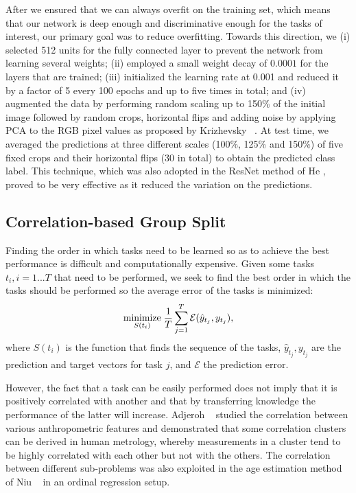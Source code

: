 \documentclass[10pt,twocolumn,letterpaper]{article}
\begin{document}
	After we ensured that we can always overfit on the training set, which means that our network is deep enough and discriminative enough for the tasks of interest, our primary goal was to reduce overfitting. Towards this direction, we (i) selected 512 units for the fully connected layer to prevent the network from learning several weights; (ii) employed a small weight decay of \(0.0001\) for the layers that are trained; (iii) initialized the learning rate at 0.001 and reduced it by a factor of 5 every 100 epochs and up to five times in total; and (iv) augmented the data by performing random scaling up to 150\% of the initial image followed by random crops, horizontal flips and adding noise by applying PCA to the RGB pixel values as proposed by Krizhevsky \etal~\cite{krizhevsky2012imagenet}. At test time, we averaged the predictions at three different scales (100\%, 125\% and 150\%) of five fixed crops and their horizontal flips (30 in total) to obtain the predicted class label. This technique, which was also adopted in the ResNet method of He \etal \cite{resNets2016}, proved to be very effective as it reduced the variation on the predictions.
	
	
	\subsection{Correlation-based Group Split}
	Finding the order in which tasks need to be learned so as to achieve the best performance is difficult and computationally expensive. Given some tasks \(t_i, i=1...T\) that need to be performed, we seek to find the best order in which the tasks should be performed so the average error of the tasks is minimized: 
	\begin{equation}\label{eq:1}
	\displaystyle \underset{\substack{S(t_i)}}{\text{minimize}} \; {\frac{1}{T}\sum\limits_{j=1}^{T} \mathcal{E}(\hat{y}_{t_j},y_{t_j}),}\\
	\end{equation}
	where \(S(t_i)\) is the function that finds the sequence of the tasks, \(\hat{y}_{t_j},y_{t_j}\) are the prediction and target vectors for task \(j\), and \(\mathcal{E}\) the prediction error. 
	
	However, the fact that a task can be easily performed does not imply that it is  positively correlated with another and that by transferring knowledge the performance of the latter will increase. Adjeroh \etal~\cite{D_2010_11241} studied the correlation between various anthropometric features and demonstrated that some correlation clusters can be derived in human metrology, whereby measurements in a cluster tend to be highly correlated with each other but not with the others. The correlation between different sub-problems was also exploited in the age estimation method of Niu \etal~\cite{Niu_2016_CVPR} in an ordinal regression setup. 
		
\end{document}
